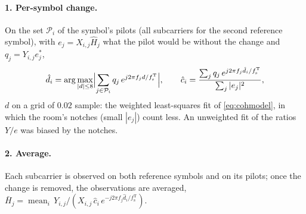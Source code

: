 \documentclass[11pt,a4paper]{article}
\newcommand{\fsT}{f_{\mathrm{s}}^{\mathrm{T}}}
\theoremstyle{remark}
\begin{document}
\paragraph{1. Per-symbol change.}
On the set $\mathcal P_i$ of the symbol's pilots (all subcarriers for the second reference symbol), with $e_j = X_{i,j} \hat H_j$ what the pilot would be without the change and $q_j = Y_{i,j} e_j^*$,
\begin{equation}
\hat d_i = \arg\max_{|d| \le 8} \Bigl|\sum_{j \in \mathcal P_i} q_j\, e^{j2\pi f_j d/\fsT}\Bigr|, \qquad \hat c_i = \frac{\sum_{j} q_j\, e^{j2\pi f_j \hat d_i/\fsT}}{\sum_j |e_j|^2},
\end{equation}
$d$ on a grid of $0.02$ sample: the weighted least-squares fit of \cref{eq:cohmodel}, in which the room's notches (small $|e_j|$) count less. An unweighted fit of the ratios $Y/e$ was biased by the notches.

\paragraph{2. Average.}
Each subcarrier is observed on both reference symbols and on its pilots; once the change is removed, the observations are averaged, $\bar H_j = \operatorname{mean}_i\, Y_{i,j} / (X_{i,j}\, \hat c_i\, e^{-j2\pi f_j \hat d_i/\fsT})$.
\end{document}
